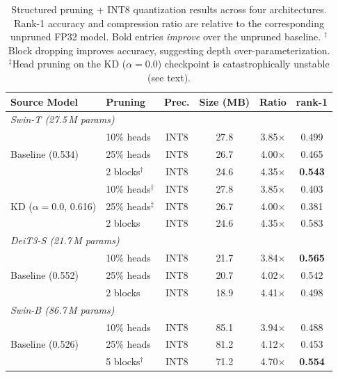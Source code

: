 \documentclass[runningheads,a4paper]{llncs}
\begin{document}
\begin{table}[!htbp]
    \centering
    \caption{Structured pruning + INT8 quantization results across four architectures. Rank-1 accuracy and compression ratio are relative to the corresponding unpruned FP32 model. Bold entries \emph{improve} over the unpruned baseline. $^\dagger$Block dropping improves accuracy, suggesting depth over-parameterization. $^\ddagger$Head pruning on the KD ($\alpha{=}0.0$) checkpoint is catastrophically unstable (see text).}
    \label{tab:pruning-results}
    \footnotesize
    \begin{tabular*}{\linewidth}{@{\extracolsep{\fill}} l l c c c c}
        \toprule
        Source Model & Pruning & Prec. & Size (MB) & Ratio & rank-1 \\
        \midrule
        \multicolumn{6}{l}{\textit{Swin-T (27.5\,M params)}} \\
        \multirow{3}{*}{\quad Baseline (0.534)}
            & 10\% heads  & INT8 &  27.8 & 3.85$\times$ & 0.499 \\
            & 25\% heads  & INT8 &  26.7 & 4.00$\times$ & 0.465 \\
            & 2 blocks$^\dagger$ & INT8 &  24.6 & 4.35$\times$ & \textbf{0.543} \\
        \cmidrule(l){2-6}
        \multirow{3}{*}{\quad KD ($\alpha{=}0.0$, 0.616)}
            & 10\% heads$^\ddagger$ & INT8 &  27.8 & 3.85$\times$ & 0.403 \\
            & 25\% heads$^\ddagger$ & INT8 &  26.7 & 4.00$\times$ & 0.381 \\
            & 2 blocks & INT8 &  24.6 & 4.35$\times$ & 0.583 \\
        \midrule
        \multicolumn{6}{l}{\textit{DeiT3-S (21.7\,M params)}} \\
        \multirow{3}{*}{\quad Baseline (0.552)}
            & 10\% heads  & INT8 &  21.7 & 3.84$\times$ & \textbf{0.565} \\
            & 25\% heads  & INT8 &  20.7 & 4.02$\times$ & 0.542 \\
            & 2 blocks    & INT8 &  18.9 & 4.41$\times$ & 0.498 \\
        \midrule
        \multicolumn{6}{l}{\textit{Swin-B (86.7\,M params)}} \\
        \multirow{3}{*}{\quad Baseline (0.526)}
            & 10\% heads  & INT8 &  85.1 & 3.94$\times$ & 0.488 \\
            & 25\% heads  & INT8 &  81.2 & 4.12$\times$ & 0.453 \\
            & 5 blocks$^\dagger$ & INT8 &  71.2 & 4.70$\times$ & \textbf{0.554} \\

\end{tabular*}
\end{table}
\end{document}
